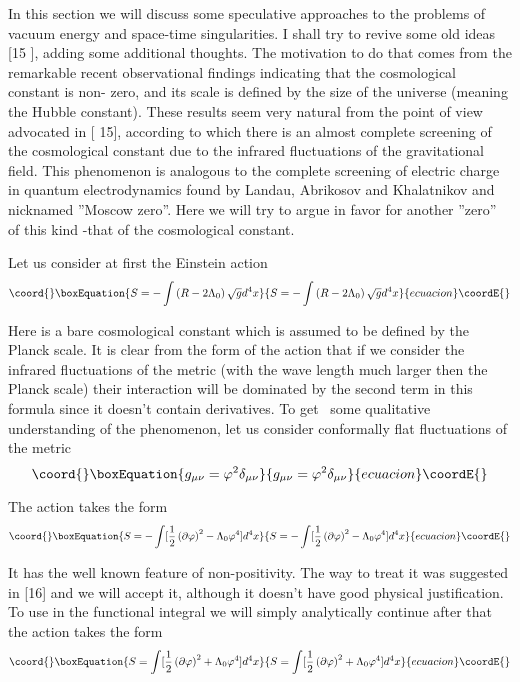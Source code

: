 \documentclass[a4paper,12pt]{article}
\begin{document}
In this section we will discuss some speculative approaches to the problems
of vacuum energy and space-time singularities. I shall try to revive some
old ideas [15 ], adding some additional thoughts. The motivation to do that
comes from the remarkable recent observational findings indicating that the
cosmological constant is non- zero, and its scale is defined by the size of
the universe (meaning the Hubble constant). These results seem very natural
from the point of view advocated in [ 15], according to which there is an
almost complete screening of the cosmological constant due to the infrared
fluctuations of the gravitational field. This phenomenon is analogous to the
complete screening of electric charge in quantum electrodynamics found by
Landau, Abrikosov and Khalatnikov and nicknamed ''Moscow zero''. Here we
will try to argue in favor for another ''zero'' of this kind -that of the
cosmological constant.

Let us consider at first the Einstein action 
\begin{equation}\coord{}\boxEquation{
S=-\int \left( R-2\Lambda _{0}\right) \sqrt{g}d^{4}x
}{
S=-\int \left( R-2\Lambda _{0}\right) \sqrt{g}d^{4}x
}{ecuacion}\coordE{}\end{equation}

Here \coordHE{} is a bare cosmological constant which is assumed to be
defined by the Planck scale. It is clear from the form of the action that if
we consider the infrared fluctuations of the metric (with the wave length
much larger then the Planck scale) their interaction will be dominated by
the second term in this formula since it doesn't contain derivatives. To get
\ some qualitative understanding of the phenomenon, let us consider
conformally flat fluctuations of the metric 
\begin{equation}\coord{}\boxEquation{
g_{\mu \nu }=\varphi ^{2}\delta _{\mu \nu }
}{
g_{\mu \nu }=\varphi ^{2}\delta _{\mu \nu }
}{ecuacion}\coordE{}\end{equation}

The action takes the form 
\begin{equation}\coord{}\boxEquation{
S=-\int [\frac{1}{2}\left( \partial \varphi \right) ^{2}-\Lambda _{0}\varphi
^{4}]d^{4}x
}{
S=-\int [\frac{1}{2}\left( \partial \varphi \right) ^{2}-\Lambda _{0}\varphi
^{4}]d^{4}x
}{ecuacion}\coordE{}\end{equation}

It has the well known feature of non-positivity. The way to treat it was
suggested in [16] and we will accept it, although it doesn't have good
physical justification. To use \coordHE{} in the functional integral we will simply
analytically continue \coordHE{} after that the action
takes the form 
\begin{equation}\coord{}\boxEquation{
S=\int [\frac{1}{2}\left( \partial \varphi \right) ^{2}+\Lambda _{0}\varphi
^{4}]d^{4}x
}{
S=\int [\frac{1}{2}\left( \partial \varphi \right) ^{2}+\Lambda _{0}\varphi
^{4}]d^{4}x
}{ecuacion}\coordE{}\end{equation}
\end{document}
